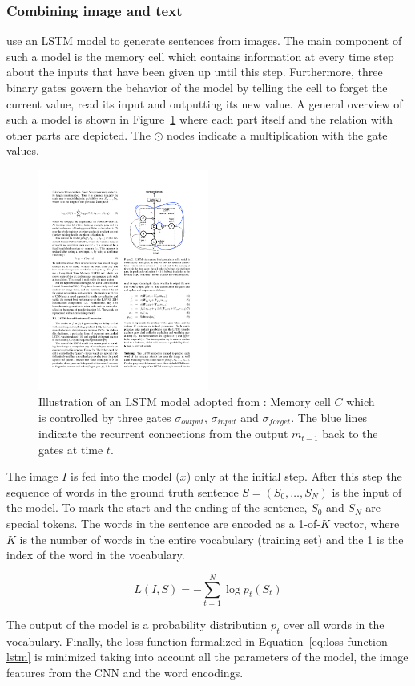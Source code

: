\subsubsection{Combining image and text}
\citeauthor{vinyals2014show} use an LSTM model to generate sentences from images. The main component of such a model is the memory cell which contains information at every time step about the inputs that have been given up until this step. Furthermore, three binary gates govern the behavior of the model by telling the cell to forget the current value, read its input and outputting its new value. A general overview of such a model is shown in Figure~\ref{fig:lstm} where each part itself and the relation with other parts are depicted. The $\odot$ nodes indicate a multiplication with the gate values.

\begin{figure}[h!]
\centering
	\includegraphics[width=0.5\textwidth]{images/LSTM}
	\caption{Illustration of an LSTM model adopted from \cite{vinyals2014show}: Memory cell $C$ which is controlled by three gates $\sigma_{output}$, $\sigma_{input}$ and $\sigma_{forget}$. The blue lines indicate the recurrent connections from the output $m_{t-1}$ back to the gates at time $t$.}
	\label{fig:lstm}
\end{figure}

The image $I$ is fed into the model ($x$) only at the initial step. After this step the sequence of words in the ground truth sentence $S = (S_0,\ldots,S_N)$ is the input of the model. To mark the start and the ending of the sentence, $S_0$ and $S_N$ are special tokens. The words in the sentence are encoded as a 1-of-$K$ vector, where $K$ is the number of words in the entire vocabulary (training set) and the 1 is the index of the word in the vocabulary.

\begin{equation}\label{eq:loss-function-lstm}
	L(I,S)=-\sum\limits_{t=1}^{N}\log p_t(S_t)
\end{equation}

The output of the model is a probability distribution $p_t$ over all words in the vocabulary. Finally, the loss function formalized in Equation~\ref{eq:loss-function-lstm} is minimized taking into account all the parameters of the model, the image features from the CNN and the word encodings.